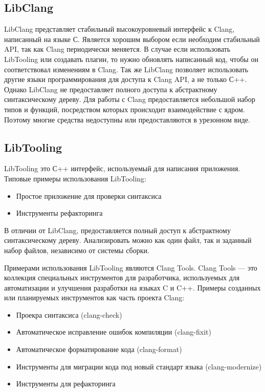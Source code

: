 \subsection*{LibClang}
LibClang представляет стабильный высокоуровневый интерфейс к Clang, написанный на языке С. 
Является хорошим выбором если необходим стабильный API, так как Clang периодически меняется.
В случае если использовать LibTooling или создавать плагин, то нужно обновлять написанный код,
чтобы он соответствовал изменениям в Clang. Так же LibClang позволяет использовать другие языки
программирования для доступа к Clang API, а не только С++. Однако LibClang не предоставляет полного доступа к 
абстрактному синтаксическому дереву. Для работы с Clang предоставляется небольшой набор типов и функций,
посредством которых происходит взаимодействие с ядром. Поэтому многие средства недоступны или 
предоставляются в урезонном виде.

\subsection*{LibTooling}
LibTooling это С++ интерфейс, используемый для написания приложения. Типовые примеры использования
LibTooling:
\begin{itemize}
	\item Простое приложение для проверки синтаксиса
	\item Инструменты рефакторинга
\end{itemize}
 
В отличии от LibClang, предоставляется полный доступ к абстрактному синтаксическому дереву. 
Анализировать можно как один файл, так и заданный набор файлов, независимо от системы сборки.

Примерами использования LibTooling являются Clang Tools. Clang Tools --- это коллекция специальных 
инструментов для разработчика, используемых для автоматизации и улучшения разработки на языках C и C++.
Примеры созданных или планируемых инструментов как часть проекта Clang:
\begin{itemize}
	\item Проекра синтаксиса (clang-check)
	\item Автоматическое исправление ошибок компиляции (clang-fixit)
	\item Автоматическое форматирование кода (clang-format)
	\item Инструменты для миграции кода под новый стандарт языка (clang-modernize)
	\item Инструменты для рефакторинга
\end{itemize}

